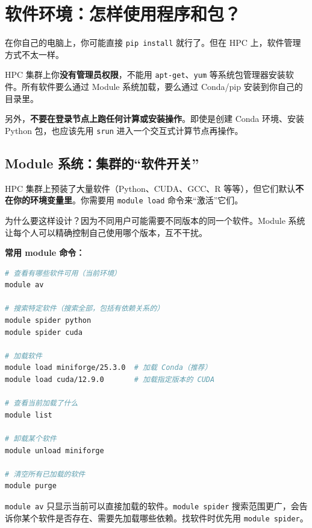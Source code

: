 \section{软件环境：怎样使用程序和包？}

在你自己的电脑上，你可能直接 \texttt{pip install} 就行了。但在 HPC 上，软件管理方式不太一样。

\begin{warnbox}
HPC 集群上你\textbf{没有管理员权限}，不能用 \texttt{apt-get}、\texttt{yum} 等系统包管理器安装软件。所有软件要么通过 Module 系统加载，要么通过 Conda/pip 安装到你自己的目录里。

另外，\textbf{不要在登录节点上跑任何计算或安装操作}。即使是创建 Conda 环境、安装 Python 包，也应该先用 \texttt{srun} 进入一个交互式计算节点再操作。
\end{warnbox}

\subsection{Module 系统：集群的``软件开关''}

HPC 集群上预装了大量软件（Python、CUDA、GCC、R 等等），但它们默认\textbf{不在你的环境变量里}。你需要用 \texttt{module load} 命令来``激活''它们。

为什么要这样设计？因为不同用户可能需要不同版本的同一个软件。Module 系统让每个人可以精确控制自己使用哪个版本，互不干扰。

\textbf{常用 module 命令：}

\begin{lstlisting}[language=bash]
# 查看有哪些软件可用（当前环境）
module av

# 搜索特定软件（搜索全部，包括有依赖关系的）
module spider python
module spider cuda

# 加载软件
module load miniforge/25.3.0  # 加载 Conda（推荐）
module load cuda/12.9.0       # 加载指定版本的 CUDA

# 查看当前加载了什么
module list

# 卸载某个软件
module unload miniforge

# 清空所有已加载的软件
module purge
\end{lstlisting}

\begin{tipbox}
\texttt{module av} 只显示当前可以直接加载的软件。\texttt{module spider} 搜索范围更广，会告诉你某个软件是否存在、需要先加载哪些依赖。找软件时优先用 \texttt{module spider}。
\end{tipbox}

